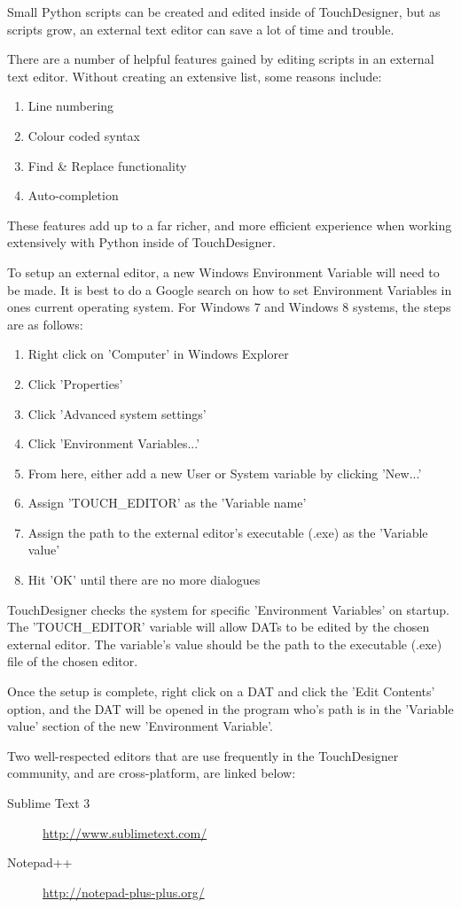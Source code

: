 \begin{fullwidth}

Small Python scripts can be created and edited inside of TouchDesigner, but as scripts grow, an external text editor can save a lot of time and trouble.

There are a number of helpful features gained by editing scripts in an external text editor. Without creating an extensive list, some reasons include:

\begin{enumerate}
\item Line numbering
\item Colour coded syntax
\item Find \& Replace functionality
\item Auto-completion
\end{enumerate}

These features add up to a far richer, and more efficient experience when working extensively with Python inside of TouchDesigner.  

To setup an external editor, a new Windows Environment Variable will need to be made. It is best to do a Google search on how to set Environment Variables in ones current operating system. For Windows 7 and Windows 8 systems, the steps are as follows:

\begin{enumerate}
\item Right click on 'Computer' in Windows Explorer
\item Click 'Properties'
\item Click 'Advanced system settings'
\item Click 'Environment Variables...'
\item From here, either add a new User or System variable by clicking 'New...'
\item Assign 'TOUCH\_EDITOR' as the 'Variable name'
\item Assign the path to the external editor's executable (.exe) as the 'Variable value'
\item Hit 'OK' until there are no more dialogues
\end{enumerate}

TouchDesigner checks the system for specific 'Environment Variables' on startup. The 'TOUCH\_EDITOR' variable will allow DATs to be edited by the chosen external editor. The variable's value should be the path to the executable (.exe) file of the chosen editor.
 
Once the setup is complete, right click on a DAT and click the 'Edit Contents' option, and the DAT will be opened in the program who's path is in the 'Variable value' section of the new 'Environment Variable'. 

Two well-respected editors that are use frequently in the TouchDesigner community, and are cross-platform, are linked below: 

\begin{description}
\item[Sublime Text 3] \url{http://www.sublimetext.com/}
\item[Notepad++] \url{http://notepad-plus-plus.org/}
\end{description}

\end{fullwidth}
